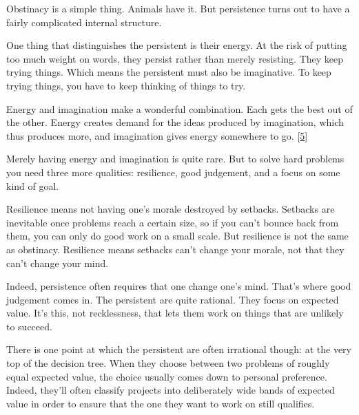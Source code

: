 Obstinacy is a simple thing. Animals
                  have it. But persistence turns out to have a fairly
                  complicated internal structure.

One thing that
                  distinguishes the persistent is their energy. At the risk of
                  putting too much weight on words, they persist rather than
                  merely resisting. They keep trying things. Which means the
                  persistent must also be imaginative. To keep trying things,
                  you have to keep thinking of things to try.

Energy
                  and imagination make a wonderful combination. Each gets the
                  best out of the other. Energy creates demand for the ideas
                  produced by imagination, which thus produces more, and
                  imagination gives energy somewhere to go.
                  [\href{\#f5n}{5}]

Merely having energy and imagination is quite
                  rare. But to solve hard problems you need three more
                  qualities: resilience, good judgement, and a focus on some
                  kind of goal.

Resilience means not having one's
                  morale destroyed by setbacks. Setbacks are inevitable once
                  problems reach a certain size, so if you can't bounce back
                  from them, you can only do good work on a small scale. But
                  resilience is not the same as obstinacy. Resilience means
                  setbacks can't change your morale, not that they can't change
                  your mind.

Indeed, persistence often requires that
                  one change one's mind. That's where good judgement comes in.
                  The persistent are quite rational. They focus on expected
                  value. It's this, not recklessness, that lets them work on
                  things that are unlikely to succeed.

There is one
                  point at which the persistent are often irrational though: at
                  the very top of the decision tree. When they choose between
                  two problems of roughly equal expected value, the choice
                  usually comes down to personal preference. Indeed, they'll
                  often classify projects into deliberately wide bands of
                  expected value in order to ensure that the one they want to
                  work on still qualifies.

